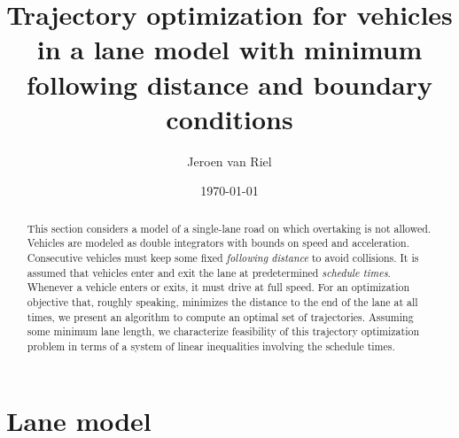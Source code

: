 \documentclass[a4paper]{article}
\author{Jeroen van Riel}
\date{\monthyeardate\today}
\title{Trajectory optimization for vehicles in a lane model with minimum
  following distance and boundary conditions}
\theoremstyle{definition}
\theoremstyle{plain}
\begin{document}
\maketitle

\begin{abstract}
  This section considers a model of a single-lane road on which overtaking is
  not allowed.
  Vehicles are modeled as double integrators with bounds on speed and
  acceleration. Consecutive vehicles must keep some fixed \textit{following
    distance} to avoid collisions.
  It is assumed that vehicles enter and exit the lane at
  predetermined \textit{schedule times}. Whenever a vehicle enters or exits, it
  must drive at full speed.
  For an optimization objective that, roughly speaking, minimizes the distance
  to the end of the lane at all times, we present an algorithm to compute an
  optimal set of trajectories.
  Assuming some minimum lane length, we characterize feasibility of this
  trajectory optimization problem in terms of a system of linear inequalities
  involving the schedule times.
\end{abstract}


\newcommand\halfopen[2]{\ensuremath{[#1,#2)}}
\newcommand\openhalf[2]{\ensuremath{(#1,#2]}}

\renewcommand{\labelitemii}{\textbullet}
\renewcommand{\labelitemiii}{\textbullet}

\section{Lane model}
\end{document}
